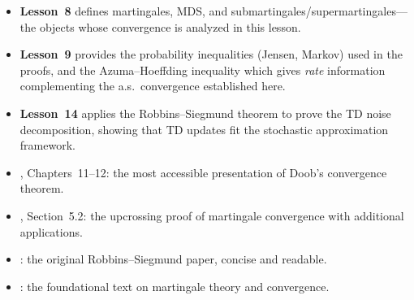 \documentclass[11pt,a4paper]{article}
\begin{document}
\begin{itemize}[nosep]
  \item \textbf{Lesson~8} defines martingales, MDS, and
    submartingales/supermartingales---the objects whose
    convergence is analyzed in this lesson.
  \item \textbf{Lesson~9} provides the probability inequalities
    (Jensen, Markov) used in the proofs, and the
    Azuma--Hoeffding inequality which gives \emph{rate}
    information complementing the a.s.\ convergence established
    here.
  \item \textbf{Lesson~14} applies the Robbins--Siegmund theorem
    to prove the TD noise decomposition, showing that TD updates
    fit the stochastic approximation framework.
  \item \citet{williams1991}, Chapters~11--12: the most
    accessible presentation of Doob's convergence theorem.
  \item \citet{durrett2019}, Section~5.2: the upcrossing proof
    of martingale convergence with additional applications.
  \item \citet{robbins1971}: the original Robbins--Siegmund
    paper, concise and readable.
  \item \citet{doob1953}: the foundational text on martingale
    theory and convergence.
\end{itemize}


\end{document}
